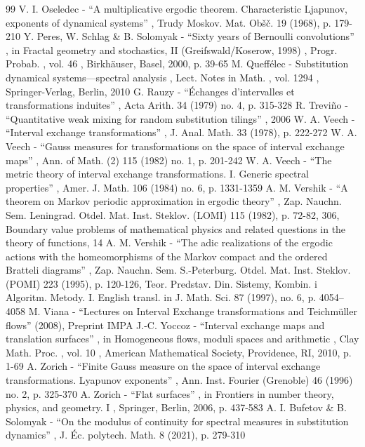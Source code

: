 \documentclass[11pt]{article}
\numberwithin{equation}{section}\newcommand{\Relation}[2][]{}\newtheorem*{prop*}{Proposition}
\theoremstyle{plain}
\theoremstyle{definition}
\begin{document}
\begin{thebibliography}{99}
 V. I. Oseledec - “A multiplicative ergodic theorem. Characteristic Ljapunov, exponents of dynamical systems” , Trudy Moskov. Mat. Obšč. 19 (1968), p. 179-210
 Y. Peres, W. Schlag \& B. Solomyak - “Sixty years of Bernoulli convolutions” , in Fractal geometry and stochastics, II (Greifswald/Koserow, 1998) , Progr. Probab. , vol. 46 , Birkhäuser, Basel, 2000, p. 39-65
 M. Queffélec - Substitution dynamical systems—spectral analysis , Lect. Notes in Math. , vol. 1294 , Springer-Verlag, Berlin, 2010
 G. Rauzy - “Échanges d’intervalles et transformations induites” , Acta Arith. 34 (1979) no. 4, p. 315-328
 R. Treviño - “Quantitative weak mixing for random substitution tilings” , 2006
 W. A. Veech - “Interval exchange transformations” , J. Anal. Math. 33 (1978), p. 222-272
 W. A. Veech - “Gauss measures for transformations on the space of interval exchange maps” , Ann. of Math. (2) 115 (1982) no. 1, p. 201-242
 W. A. Veech - “The metric theory of interval exchange transformations. I. Generic spectral properties” , Amer. J. Math. 106 (1984) no. 6, p. 1331-1359
 A. M. Vershik - “A theorem on Markov periodic approximation in ergodic theory” , Zap. Nauchn. Sem. Leningrad. Otdel. Mat. Inst. Steklov. (LOMI) 115 (1982), p. 72-82, 306, Boundary value problems of mathematical physics and related questions in the theory of functions, 14
 A. M. Vershik - “The adic realizations of the ergodic actions with the homeomorphisms of the Markov compact and the ordered Bratteli diagrams” , Zap. Nauchn. Sem. S.-Peterburg. Otdel. Mat. Inst. Steklov. (POMI) 223 (1995), p. 120-126, Teor. Predstav. Din. Sistemy, Kombin. i Algoritm. Metody. I. English transl. in J. Math. Sci. 87 (1997), no. 6, p. 4054–4058
 M. Viana - “Lectures on Interval Exchange transformations and Teichmüller flows” (2008), Preprint IMPA
 J.-C. Yoccoz - “Interval exchange maps and translation surfaces” , in Homogeneous flows, moduli spaces and arithmetic , Clay Math. Proc. , vol. 10 , American Mathematical Society, Providence, RI, 2010, p. 1-69
 A. Zorich - “Finite Gauss measure on the space of interval exchange transformations. Lyapunov exponents” , Ann. Inst. Fourier (Grenoble) 46 (1996) no. 2, p. 325-370
 A. Zorich - “Flat surfaces” , in Frontiers in number theory, physics, and geometry. I , Springer, Berlin, 2006, p. 437-583
 A. I. Bufetov \& B. Solomyak - “On the modulus of continuity for spectral measures in substitution dynamics” , J. Éc. polytech. Math. 8 (2021), p. 279-310
\end{thebibliography}
\end{document}
